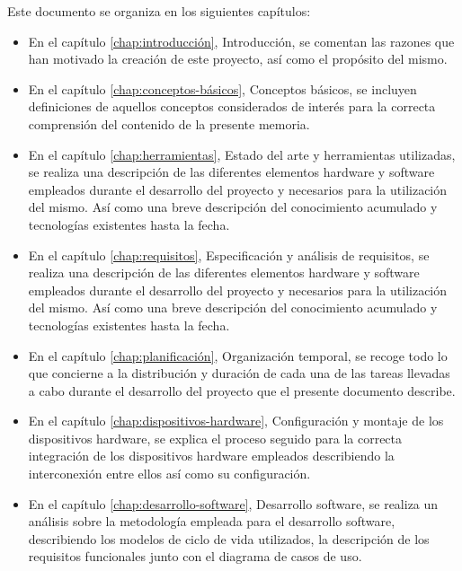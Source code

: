 Este documento se organiza en los siguientes capítulos:\\

\begin{itemize}

\item En el capítulo \ref{chap:introducción}, Introducción, se comentan las razones que han motivado la creación de este proyecto, así como el propósito del mismo.

\item En el capítulo \ref{chap:conceptos-básicos}, Conceptos básicos, se incluyen definiciones de aquellos conceptos considerados de interés para la correcta comprensión del contenido de la presente memoria.

\item En el capítulo \ref{chap:herramientas}, Estado del arte y herramientas utilizadas, se realiza una descripción de las diferentes elementos hardware y software empleados durante el desarrollo del proyecto y necesarios para la utilización del mismo. Así como una breve descripción del conocimiento acumulado y tecnologías existentes hasta la fecha.

\item En el capítulo \ref{chap:requisitos}, Especificación y análisis de requisitos, se realiza una descripción de las diferentes elementos hardware y software empleados durante el desarrollo del proyecto y necesarios para la utilización del mismo. Así como una breve descripción del conocimiento acumulado y tecnologías existentes hasta la fecha.

\item En el capítulo \ref{chap:planificación}, Organización temporal, se recoge todo lo que concierne a la distribución y duración de cada una de las tareas llevadas a cabo durante el desarrollo del proyecto que el presente documento describe.

\item En el capítulo \ref{chap:dispositivos-hardware}, Configuración y montaje de los dispositivos hardware, se explica el proceso seguido para la correcta integración de los dispositivos hardware empleados describiendo la interconexión entre ellos así como su configuración. 

\item En el capítulo \ref{chap:desarrollo-software}, Desarrollo software, se realiza un análisis sobre la metodología empleada para el desarrollo software, describiendo los modelos de ciclo de vida utilizados, la descripción de los requisitos funcionales junto con el diagrama de casos de uso.


\end{itemize}
